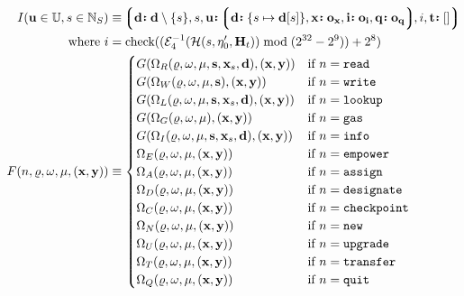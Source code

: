 \begin{align}
  I(\mathbf{u} \in \mathbb{U}, s \in \N_S) &\equiv \tup{
    \is{\mathbf{d}}{\mathbf{d} \setminus \{ s \}},
    s,
    \is{\mathbf{u}}{\tuple{\is{\mathbf{d}}{\{s \mapsto \mathbf{d}[s]\}}, \is{\mathbf{x}}{\mathbf{o}_\mathbf{x}}, \is{\mathbf{i}}{\mathbf{o}_\mathbf{i}}, \is{\mathbf{q}}{\mathbf{o}_\mathbf{q}}}},
    i,
    \is{\mathbf{t}}{[]}
  }\\
  \where i &= \text{check}((\de_4(\mathcal{H}(s, \eta'_0, \mathbf{H}_t)) \bmod (2^{32}-2^9)) + 2^8) \\
  F(n, \gascounter, \registers, \memory, (\mathbf{x}, \mathbf{y})) &\equiv \begin{cases}
    G(\Omega_R(\gascounter, \registers, \memory, \mathbf{s}, \mathbf{x}_s, \mathbf{d}), (\mathbf{x}, \mathbf{y})) &\when n = \mathtt{read} \\
    G(\Omega_W(\gascounter, \registers, \memory, \mathbf{s}), (\mathbf{x}, \mathbf{y})) &\when n = \mathtt{write} \\
    G(\Omega_L(\gascounter, \registers, \memory, \mathbf{s}, \mathbf{x}_s, \mathbf{d}), (\mathbf{x}, \mathbf{y})) &\when n = \mathtt{lookup} \\
    G(\Omega_G(\gascounter, \registers, \memory), (\mathbf{x}, \mathbf{y})) &\when n = \mathtt{gas} \\
    G(\Omega_I(\gascounter, \registers, \memory, \mathbf{s}, \mathbf{x}_s, \mathbf{d}), (\mathbf{x}, \mathbf{y})) &\when n = \mathtt{info} \\
    \Omega_E(\gascounter, \registers, \memory, (\mathbf{x}, \mathbf{y})) &\when n = \mathtt{empower}\\
    \Omega_A(\gascounter, \registers, \memory, (\mathbf{x}, \mathbf{y})) &\when n = \mathtt{assign}\\
    \Omega_D(\gascounter, \registers, \memory, (\mathbf{x}, \mathbf{y})) &\when n = \mathtt{designate}\\
    \Omega_C(\gascounter, \registers, \memory, (\mathbf{x}, \mathbf{y})) &\when n = \mathtt{checkpoint} \\
    \Omega_N(\gascounter, \registers, \memory, (\mathbf{x}, \mathbf{y})) &\when n = \mathtt{new} \\
    \Omega_U(\gascounter, \registers, \memory, (\mathbf{x}, \mathbf{y})) &\when n = \mathtt{upgrade} \\
    \Omega_T(\gascounter, \registers, \memory, (\mathbf{x}, \mathbf{y})) &\when n = \mathtt{transfer} \\
    \Omega_Q(\gascounter, \registers, \memory, (\mathbf{x}, \mathbf{y})) &\when n = \mathtt{quit} \\

\end{cases}
\end{align}
